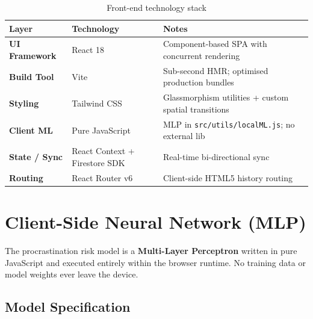 \documentclass[12pt,a4paper]{report}
\begin{document}
\begin{table}[H]
  \centering
  \renewcommand{\arraystretch}{1.4}
  \begin{tabularx}{\linewidth}{>{\bfseries}l l X}
    \toprule
    \textbf{Layer} & \textbf{Technology} & \textbf{Notes} \\
    \midrule
    UI Framework    & React 18          & Component-based SPA with concurrent rendering \\
    Build Tool      & Vite              & Sub-second HMR; optimised production bundles \\
    Styling         & Tailwind CSS      & Glassmorphism utilities + custom spatial transitions \\
    Client ML       & Pure JavaScript   & MLP in \texttt{src/utils/localML.js}; no external lib \\
    State / Sync    & React Context + Firestore SDK & Real-time bi-directional sync \\
    Routing         & React Router v6   & Client-side HTML5 history routing \\
    \bottomrule
  \end{tabularx}
  \caption{Front-end technology stack}
\end{table}

\section{Client-Side Neural Network (MLP)}

The procrastination risk model is a \textbf{Multi-Layer Perceptron} written in pure JavaScript and executed entirely within the browser runtime. No training data or model weights ever leave the device.

\subsection{Model Specification}
\end{document}
